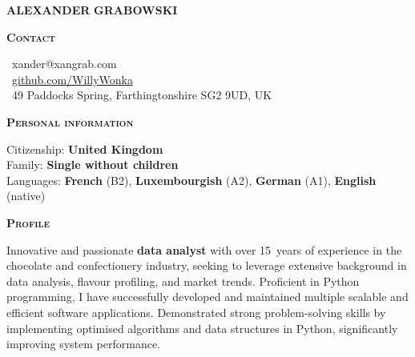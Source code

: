 \documentclass[11pt, a4paper]{article}
\newcommand{\headleft}[1]{\vspace*{3ex}\textsc{\textbf{#1}}\par%
    \vspace*{-1.5ex}\hrulefill\par\vspace*{0.7ex}}
\begin{document}
\setlength{\topskip}{0pt}
\setlength{\parindent}{0pt}
\setlength{\parskip}{0pt}
\setlength{\fboxsep}{0pt}
\pagestyle{empty}
\raggedbottom

\begin{minipage}[t]{0.33\textwidth} %
\colorbox{cvblue}{\begin{minipage}[t][5mm][t]{\textwidth}\null\hfill\null\end{minipage}}

\vspace{-.2ex} %
\colorbox{cvblue!90}{\color{white}  %
\textwidth\relax%
\begin{minipage}[t][293mm][t]{0.82\textwidth}
\raggedright
\vspace*{2.0ex}

\begin{center}
    \Huge \textbf{ALEXANDER}\vspace{0.5ex}
    \textbf{GRABOWSKI} \normalsize 
\end{center}


\vspace*{-2.5ex} 

\headleft{Contact}
\small %
\MVAt\ {\small xander@xangrab.com} \\[0.4ex]
\Mundus\ \href{https://github.com/WillyWonka}{github.com/WillyWonka} \\[0.1ex]
\Letter\ 49 Paddocks Spring, Farthingtonshire SG2 9UD, UK
\normalsize

\headleft{Personal information}
Citizenship: \textbf{United Kingdom} \\[0.5ex]
Family: \textbf{Single without children} \\[0.5ex]
Languages: \textbf{French} (B2), \textbf{Luxembourgish} (A2), \textbf{German} (A1), \textbf{English} (native)

\headleft{Profile}
Innovative and passionate \textbf{data analyst} with over 15~years of experience in the chocolate and confectionery industry, seeking to leverage extensive background in data analysis, flavour profiling, and market trends.
Proficient in Python programming, I have successfully developed and maintained multiple scalable and efficient software applications.
Demonstrated strong problem-solving skills by implementing optimised algorithms and data structures in Python, significantly improving system performance.


\end{minipage}}
\end{minipage}
\end{document}
